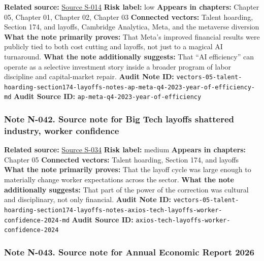 \documentclass[
  american,
  11pt,
  letterpaper,
]{article}
\begin{document}
\textbf{Related source:}
\hyperref[source-s-014-meta-posts-sharp-profit-revenue-increase-in-q4-thanks-to-cost-cuts-and-advertising-rebound]{Source
S-014} \textbf{Risk label:} low \textbf{Appears in chapters:} Chapter
05, Chapter 01, Chapter 02, Chapter 03 \textbf{Connected vectors:}
Talent hoarding, Section 174, and layoffs, Cambridge Analytica, Meta,
and the metaverse diversion \textbf{What the note primarily proves:}
That Meta's improved financial results were publicly tied to both cost
cutting and layoffs, not just to a magical AI turnaround. \textbf{What
the note additionally suggests:} That ``AI efficiency'' can operate as a
selective investment story inside a broader program of labor discipline
and capital-market repair. \textbf{Audit Note ID:}
\texttt{vectors-05-talent-hoarding-section174-layoffs-notes-ap-meta-q4-2023-year-of-efficiency-md}
\textbf{Audit Source ID:} \texttt{ap-meta-q4-2023-year-of-efficiency}

\subsubsection{Note N-042. Source note for Big Tech layoffs shattered
industry, worker
confidence}\label{note-n-042-vectors-05-talent-hoarding-section174-layoffs-notes-axios-tech-layoffs-worker-confidence-2024-md}

\textbf{Related source:}
\hyperref[source-s-034-big-tech-layoffs-shattered-industry-worker-confidence]{Source
S-034} \textbf{Risk label:} medium \textbf{Appears in chapters:} Chapter
05 \textbf{Connected vectors:} Talent hoarding, Section 174, and layoffs
\textbf{What the note primarily proves:} That the layoff cycle was large
enough to materially change worker expectations across the sector.
\textbf{What the note additionally suggests:} That part of the power of
the correction was cultural and disciplinary, not only financial.
\textbf{Audit Note ID:}
\texttt{vectors-05-talent-hoarding-section174-layoffs-notes-axios-tech-layoffs-worker-confidence-2024-md}
\textbf{Audit Source ID:}
\texttt{axios-tech-layoffs-worker-confidence-2024}

\subsubsection{Note N-043. Source note for Annual Economic Report
2026}\label{note-n-043-vectors-05-talent-hoarding-section174-layoffs-notes-bis-annual-economic-report-2026-md}
\end{document}

